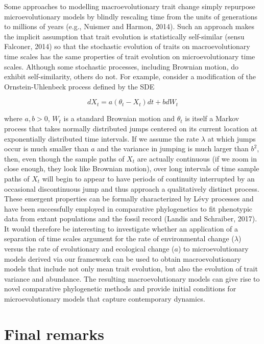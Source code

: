 \documentclass[]{elsarticle} %
\begin{document}
Some approaches to modelling macroevolutionary trait change simply
repurpose microevolutionary models by blindly rescaling time from the
units of generations to millions of years (e.g., Nuismer and Harmon,
2014). Such an approach makes the implicit assumption that trait
evolution is statistically self-similar (sensu Falconer, 2014) so that
the stochastic evolution of traits on macroevolutionary time scales has
the same properties of trait evolution on microevolutionary time scales.
Although some stochastic processes, including Brownian motion, do
exhibit self-similarity, others do not. For example, consider a
modification of the Ornstein-Uhlenbeck process defined by the SDE

\begin{equation}
dX_t=a(\theta_t-X_t)dt+bdW_t
\end{equation}

where \(a,b>0\), \(W_t\) is a standard Brownian motion and \(\theta_t\)
is itself a Markov process that takes normally distributed jumps
centered on its current location at exponentially distributed time
intervals. If we assume the rate \(\lambda\) at which jumps occur is
much smaller than \(a\) and the variance in jumping is much larger than
\(b^2\), then, even though the sample paths of \(X_t\) are actually
continuous (if we zoom in close enough, they look like Brownian motion),
over long intervals of time sample paths of \(X_t\) will begin to appear
to have periods of continuity interrupted by an occasional discontinuous
jump and thus approach a qualitatively distinct process. These emergent
properties can be formally characterized by Lévy processes and have been
successfully employed in comparative phylogenetics to fit phenotypic
data from extant populations and the fossil record (Landis and
Schraiber, 2017). It would therefore be interesting to investigate
whether an application of a separation of time scales argument for the
rate of environmental change (\(\lambda\)) versus the rate of
evolutionary and ecological change (\(a\)) to microevolutionary models
derived via our framework can be used to obtain macroevolutionary models
that include not only mean trait evolution, but also the evolution of
trait variance and abundance. The resulting macroevolutionary models can
give rise to novel comparative phylogenetic methods and provide initial
conditions for microevolutionary models that capture contemporary
dynamics.

\hypertarget{final-remarks}{%
\section{Final remarks}\label{final-remarks}}
\end{document}
